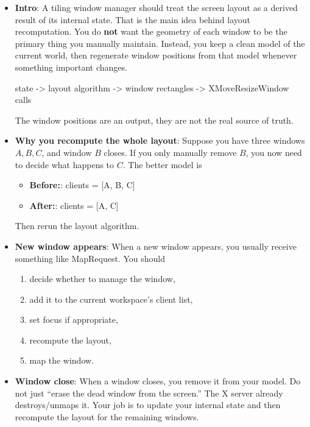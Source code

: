 \documentclass{report}
\begin{document}
    \pagebreak 
    \begin{itemize}
        \item \textbf{Intro}: A tiling window manager should treat the screen layout as a derived result of its internal state.
            \bigbreak \noindent 
            That is the main idea behind layout recomputation. You do \textbf{not} want the geometry of each window to be the primary thing you manually maintain. Instead, you keep a clean model of the current world, then regenerate window positions from that model whenever something important changes.
            \bigbreak \noindent 
            \begin{center}
                state -> layout algorithm -> window rectangles -> XMoveResizeWindow calls
            \end{center}
            \bigbreak \noindent 
            The window positions are an output, they are not the real source of truth.
        \item \textbf{Why you recompute the whole layout}: Suppose you have three windows $A,B,C$, and window $B$ closes. If you only manually remove $B$, you now need to decide what happens to $C$.
            \bigbreak \noindent 
            The better model is 
            \begin{itemize}
                \item \textbf{Before:}: clients = [A, B, C]
                \item \textbf{After:}: clients = [A, C]
            \end{itemize}
            Then rerun the layout algorithm. 
        \item \textbf{New window appears}: When a new window appears, you usually receive something like MapRequest. You should
            \begin{enumerate}
                \item decide whether to manage the window,
                \item add it to the current workspace’s client list,
                \item set focus if appropriate,
                \item recompute the layout,
                \item map the window.
            \end{enumerate}
        \item \textbf{Window close}: When a window closes, you remove it from your model. Do not just “erase the dead window from the screen.” The X server already destroys/unmaps it. Your job is to update your internal state and then recompute the layout for the remaining windows.

    \end{itemize}
\end{document}
